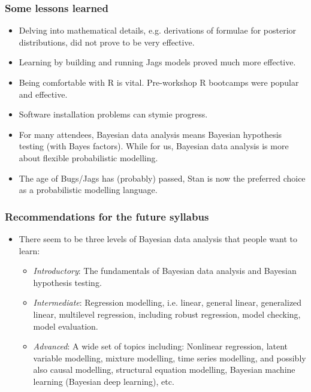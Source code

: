 \begin{frame}
	\frametitle{Some lessons learned}

	\begin{itemize}
		\item Delving into mathematical details, e.g. derivations of formulae for posterior distributions, did not prove to be very effective.
		\item Learning by building and running Jags models proved much more effective.
		\item Being comfortable with R is vital. Pre-workshop R bootcamps were popular and effective.
		\item Software installation problems can stymie progress.
		\item For many attendees, Bayesian data analysis means Bayesian hypothesis testing (with Bayes factors). While for us, Bayesian data analysis is more about flexible probabilistic modelling.
		\item The age of Bugs/Jags has (probably) passed, Stan is now the preferred choice as a probabilistic modelling language.

	\end{itemize}

\end{frame}

\begin{frame}
	\frametitle{Recommendations for the future syllabus}


	\begin{itemize}
		\item There seem to be three levels of Bayesian data analysis that people want to learn:

	\begin{itemize}

		\item \emph{Introductory}: The fundamentals of Bayesian data analysis and Bayesian hypothesis testing.
		\item \emph{Intermediate}: Regression modelling, i.e. linear, general linear, generalized linear, multilevel regression, including robust regression, model checking, model evaluation.
		\item \emph{Advanced}:  A wide set of topics including: Nonlinear regression, latent variable modelling, mixture modelling, time series modelling, and possibly also causal modelling, structural equation modelling, Bayesian machine learning (Bayesian deep learning), etc.
	\end{itemize}

	\end{itemize}

\end{frame}


